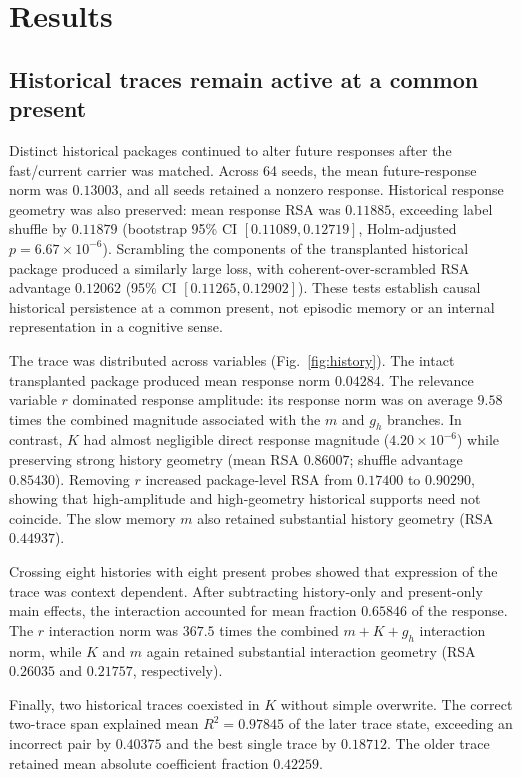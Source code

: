 \documentclass[aps,pre,preprint,superscriptaddress,nofootinbib]{revtex4-2}
\begin{document}
\section{Results}

\subsection{Historical traces remain active at a common present}

Distinct historical packages continued to alter future responses after the fast/current carrier was matched. Across 64 seeds, the mean future-response norm was $0.13003$, and all seeds retained a nonzero response. Historical response geometry was also preserved: mean response RSA was $0.11885$, exceeding label shuffle by $0.11879$ (bootstrap 95\% CI $[0.11089,0.12719]$, Holm-adjusted $p=6.67\times10^{-6}$). Scrambling the components of the transplanted historical package produced a similarly large loss, with coherent-over-scrambled RSA advantage $0.12062$ (95\% CI $[0.11265,0.12902]$). These tests establish causal historical persistence at a common present, not episodic memory or an internal representation in a cognitive sense.

The trace was distributed across variables (Fig.~\ref{fig:history}). The intact transplanted package produced mean response norm $0.04284$. The relevance variable $r$ dominated response amplitude: its response norm was on average $9.58$ times the combined magnitude associated with the $m$ and $g_h$ branches. In contrast, $K$ had almost negligible direct response magnitude ($4.20\times10^{-6}$) while preserving strong history geometry (mean RSA $0.86007$; shuffle advantage $0.85430$). Removing $r$ increased package-level RSA from $0.17400$ to $0.90290$, showing that high-amplitude and high-geometry historical supports need not coincide. The slow memory $m$ also retained substantial history geometry (RSA $0.44937$).

Crossing eight histories with eight present probes showed that expression of the trace was context dependent. After subtracting history-only and present-only main effects, the interaction accounted for mean fraction $0.65846$ of the response. The $r$ interaction norm was $367.5$ times the combined $m+K+g_h$ interaction norm, while $K$ and $m$ again retained substantial interaction geometry (RSA $0.26035$ and $0.21757$, respectively).

Finally, two historical traces coexisted in $K$ without simple overwrite. The correct two-trace span explained mean $R^2=0.97845$ of the later trace state, exceeding an incorrect pair by $0.40375$ and the best single trace by $0.18712$. The older trace retained mean absolute coefficient fraction $0.42259$.
\end{document}
